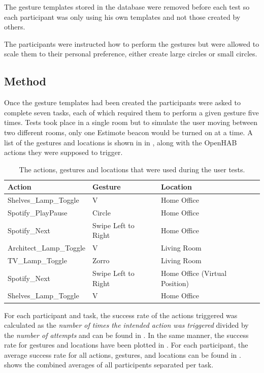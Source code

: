The gesture templates stored in the database were removed before each test so each participant was only using his own templates and not those created by others.

The participants were instructed how to perform the gestures but were allowed to scale them to their personal preference, \eg either create large circles or small circles.

\subsection{Method}

Once the gesture templates had been created the participants were asked to complete seven tasks, each of which required them to perform a given gesture five times.
Tests took place in a single room but to simulate the user moving between two different rooms, only one Estimote beacon would be turned on at a time.
A list of the gestures and locations is shown in in , along with the OpenHAB actions they were supposed to trigger.

\begin{table}[h]
\centering
\begin{tabular}{|l|l|l|}
\hline
\textbf{Action}         & \textbf{Gesture}    & \textbf{Location}              \\ \hline
Shelves\_Lamp\_Toggle   & V                   & Home Office                    \\ \hline
Spotify\_PlayPause      & Circle              & Home Office                    \\ \hline
Spotify\_Next           & Swipe Left to Right & Home Office                    \\ \hline
Architect\_Lamp\_Toggle & V                   & Living Room                    \\ \hline
TV\_Lamp\_Toggle        & Zorro               & Living Room                    \\ \hline
Spotify\_Next           & Swipe Left to Right & Home Office (Virtual Position) \\ \hline
Shelves\_Lamp\_Toggle   & V                   & Home Office                    \\ \hline
\end{tabular}
\caption{The actions, gestures and locations that were used during the user tests.}
\label{table:user-test-tasks}
\end{table}

For each participant and task, the success rate of the actions triggered was calculated as the \emph{number of times the intended action was triggered} divided by the \emph{number of attempts} and can be found in .
In the same manner, the success rate for gestures and locations have been plotted in .
For each participant, the average success rate for all actions, gestures, and locations can be found in .
 shows the combined averages of all participents separated per task.


